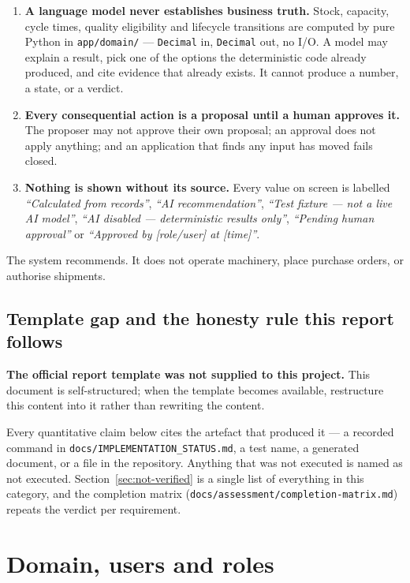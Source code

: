 \documentclass[11pt,a4paper]{article}
\begin{document}
\begin{enumerate}
\item \textbf{A language model never establishes business truth.} Stock,
  capacity, cycle times, quality eligibility and lifecycle transitions are
  computed by pure Python in \texttt{app/domain/} --- \texttt{Decimal} in,
  \texttt{Decimal} out, no I/O. A model may explain a result, pick one of the
  options the deterministic code already produced, and cite evidence that
  already exists. It cannot produce a number, a state, or a verdict.
\item \textbf{Every consequential action is a proposal until a human approves
  it.} The proposer may not approve their own proposal; an approval does not
  apply anything; and an application that finds any input has moved fails
  closed.
\item \textbf{Nothing is shown without its source.} Every value on screen is
  labelled \emph{``Calculated from records''}, \emph{``AI recommendation''},
  \emph{``Test fixture --- not a live AI model''}, \emph{``AI disabled ---
  deterministic results only''}, \emph{``Pending human approval''} or
  \emph{``Approved by [role/user] at [time]''}.
\end{enumerate}

The system recommends. It does not operate machinery, place purchase orders, or
authorise shipments.

\subsection{Template gap and the honesty rule this report follows}
\label{sec:template-gap}

\textbf{The official report template was not supplied to this project.} This
document is self-structured; when the template becomes available, restructure
this content into it rather than rewriting the content.

Every quantitative claim below cites the artefact that produced it --- a
recorded command in \texttt{docs/IMPLEMENTATION\_STATUS.md}, a test name, a
generated document, or a file in the repository. Anything that was not executed
is named as not executed. Section~\ref{sec:not-verified} is a single list of
everything in this category, and the completion matrix
(\texttt{docs/assessment/completion-matrix.md}) repeats the verdict per
requirement.

\section{Domain, users and roles}
\end{document}
